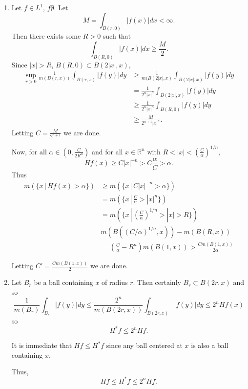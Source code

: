 \documentclass[12pt]{Qual}
\begin{document}
\begin{solution}$\,$
\begin{enumerate}[label=(\alph*)]
    \item Let $f\in L^1$, $f\not0$. Let $$M=\int_{B(r,0)}|f(x)|dx<\infty.$$ Then there exists some $R>0$ such that $$\int_{B(R,0)}|f(x)|dx\ge\frac{M}{2}.$$ Since $|x|>R$, $B(R,0)\subset B(2|x|,x),$ \begin{align*}
        \sup_{r>0}\frac{1}{m(B(r,x))}\int_{B(r,x)}|f(y)|dy&\ge\frac{1}{m(B(2|x|,x)}\int_{B(2|x|,x)}|f(y)|dy\\
        &=\frac{1}{2^n|x|^n}\int_{B(2|x|,x)}|f(y)|dy\\
        &\ge\frac{1}{2^n|x|^n}\int_{B(R,0)}|f(y)|dy\\
        &\ge\frac{M}{2^{n+1}|x|^n}.
    \end{align*}
    Letting $C=\frac{M}{2^{n+1}}$ we are done.

    Now, for all $\alpha\in(0,\frac{C}{2 R^n})$ and for all $x\in\mathbb{R}^n$ with $R<|x|<\left(\frac{C}{\alpha}\right)^{1/n}$, $$Hf(x)\ge C|x|^{-n}>C\frac{\alpha}{C}>\alpha.$$ Thus \begin{align*}
        m(\{x\,|\,Hf(x)>\alpha\})&\ge m(\{x\,|\,C|x|^{-n}>\alpha\})\\
        &=m(\{x\,|\,\frac{C}{\alpha}>|x|^n\})\\
        &=m(\{x\,|\,\left(\frac{C}{\alpha}\right)^{1/n}>|x|>R\})\\
        &m(B((C/\alpha)^{1/n},x))-m(B(R,x))\\
        &=\left(\frac{C}{\alpha}-R^n\right)m(B(1,x))>\frac{Cm(B(1,x))}{2\alpha}
    \end{align*}

    Letting $C'=\frac{Cm(B(1,x))}{2}$ we are done.
    \item Let $B_r$ be a ball containing $x$ of radius $r$. Then certainly $B_r\subset B(2r,x)$ and so $$\frac{1}{m(B_r)}\int_{B_r}|f(y)|dy\le\frac{2^n}{m(B(2r,x))}\int_{B(2r,x)}|f(y)|dy\le2^nHf(x)$$ so $$H^*f\le 2^n Hf.$$

    It is immediate that $Hf\le H^*f$ since any ball centered at $x$ is also a ball containing $x$.

    Thus, $$Hf\le H^*f\le 2^nHf.$$
\end{enumerate}
\end{solution}
\vspace{0.5cm}
\end{document}
